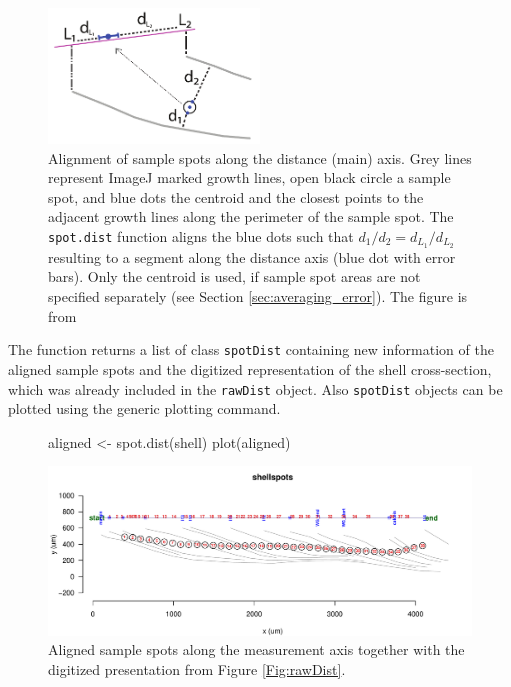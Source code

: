 \documentclass[11pt, a4paper]{article}
\newcommand{\mnote}[1]
{\marginnote{\footnotesize \raggedright \texttt{#1}}}
\begin{document}
\begin{figure}[h]
\begin{center}
\includegraphics[width=0.5\textwidth]{spot_alignment.pdf}
\caption{Alignment of sample spots along the distance (main) axis. Grey lines represent ImageJ marked growth lines, open black circle a sample spot, and blue dots the centroid and the closest points to the adjacent growth lines along the perimeter of the sample spot. The \texttt{spot.dist} function aligns the blue dots such that $d_1/d_2 = d_{L_1}/d_{L_2}$ resulting to a segment along the distance axis (blue dot with error bars). Only the centroid is used, if sample spot areas are not specified separately (see Section \ref{sec:averaging_error}). The figure is from \citet{d18O_paper}}
\label{Fig:traverse}
\end{center}
\end{figure}

\mnote{plot.
spotDist} The function returns a list of class \texttt{spotDist} containing new information of the aligned sample spots and the digitized representation of the shell cross-section, which was already included in the \texttt{rawDist} object. Also \texttt{spotDist} objects can be plotted using the generic plotting command.

\begin{figure}[H]
\begin{center}
\begin{Schunk}
\begin{Sinput}
 aligned <- spot.dist(shell)
 plot(aligned)
\end{Sinput}
\end{Schunk}
\includegraphics{sclero_tutorial-plot2}
\end{center}
\caption{Aligned sample spots along the measurement axis together with the digitized presentation from Figure \ref{Fig:rawDist}.}
\end{figure}
\end{document}
